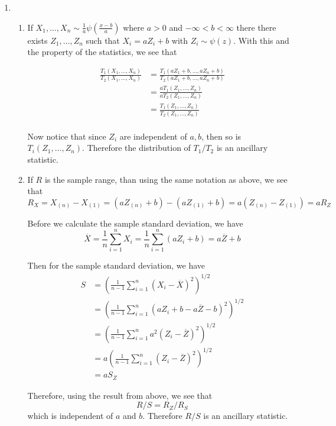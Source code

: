 \documentclass[12pt]{article}  %
\begin{document}
\begin{enumerate}
\item 
\begin{enumerate}
\item If $X_1, \ldots, X_n \sim \frac{1}{a}\psi(\frac{x - b}{a})$ where $a>0$ and $-\infty < b <\infty$ there there exists $Z_1, \ldots, Z_n$ such that $X_i = aZ_i + b$ with $Z_i\sim\psi(z)$. With this and the property of the statistics, we see that 

\begin{align*}
\frac{T_1(X_1, \ldots, X_n)}{T_2(X_1, \ldots, X_n)} &= \frac{T_1(aZ_1 + b , \ldots, aZ_n + b )}{T_2(aZ_1 + b , \ldots, aZ_n + b )}\\
&= \frac{aT_1(Z_1, \ldots, Z_n)}{aT_2(Z_1, \ldots, Z_n)}\\
&= \frac{T_1(Z_1, \ldots, Z_n)}{T_2(Z_1, \ldots, Z_n)}\\
\end{align*} 

Now notice that since $Z_i$ are independent of $a,b$, then so is $T_i(Z_1, \ldots, Z_n)$. Therefore the distribution of $T_1/T_2$ is an ancillary statistic. 

\item If $R$ is the sample range, than using the same notation as above, we see that $$R_X = X_{(n)} - X_{(1)} = (aZ_{(n)} + b ) - (aZ_{(1)} + b)  = a(Z_{(n)} - Z_{(1)}) = aR_Z$$

Before we calculate the sample standard deviation, we have $$\overline{X} = \frac{1}{n}\sum_{i=1}^nX_i = \frac{1}{n}\sum_{i=1}^n (aZ_i + b) = a\overline{Z} + b$$

Then for the sample standard deviation, we have 
\begin{align*}
S &= \left(\frac{1}{n-1}\sum_{i=1}^{n}(X_i - \overline{X})^2\right)^{1/2}\\
 &= \left(\frac{1}{n-1}\sum_{i=1}^{n}(aZ_i + b - a\overline{Z} - b)^2\right)^{1/2}\\
 &= \left(\frac{1}{n-1}\sum_{i=1}^{n}a^2(Z_i  - \overline{Z})^2\right)^{1/2}\\
 &= a\left(\frac{1}{n-1}\sum_{i=1}^{n}(Z_i  - \overline{Z})^2\right)^{1/2}\\
 &= aS_Z
\end{align*}

Therefore, using the result from above, we see that $$R/S = R_Z/R_S$$ which is independent of $a$ and $b$. Therefore $R/S$ is an ancillary statistic. 
\end{enumerate}
\end{enumerate}
\end{document}
